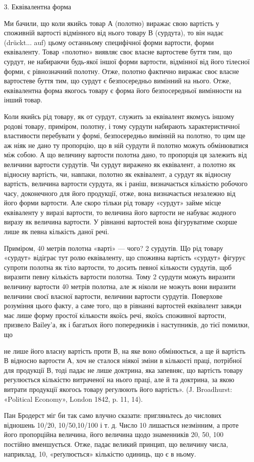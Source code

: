 3. Еквівалентна форма

Ми бачили, що коли якийсь товар А (полотно) виражає свою вартість у споживній вартості відмінного
від нього товару В (сурдута), то він надає (drückt... auf) цьому останньому специфічної форми
вартости, форми еквіваленту. Товар «полотно» виявляє своє власне вартостеве буття тим, що сурдут, не
набираючи будь-якої іншої форми вартости, відмінної від його тілесної форми, є рівнозначний полотну.
Отже, полотно фактично виражає своє власне вартостеве буття тим, що сурдут є безпосередньо вимінний
на нього. Отже, еквівалентна форма якогось товару є форма його безпосередньої вимінности на інший
товар.

Коли якийсь рід товару, як от сурдут, служить за еквівалент якомусь іншому родові товару, приміром,
полотну, і тому сурдути набирають характеристичної властивости перебувати у формі, безпосередньо
вимінній на полотно, то цим ще аж ніяк не дано ту пропорцію, що в ній сурдути й полотно можуть
обмінюватися між собою. А що величину вартости полотна дано, то пропорція ця залежить від величини
вартости сурдутів. Чи сурдут виражено як еквівалент, а полотно як відносну вартість, чи, навпаки,
полотно як еквівалент, а сурдут як відносну вартість, величина вартости сурдута, як і раніш,
визначається кількістю робочого часу, доконечного для його продукції, отже, вона  визначається
незалежно від його форми вартости. Але скоро тільки рід товару «сурдут» займе місце еквіваленту у
виразі вартости, то величина його вартости не набуває жодного виразу як величина вартости. У
рівнанні вартостей вона фігуруватиме скорше лише як певна кількість даної речі.

Приміром, 40 метрів полотна «варті» — чого? 2 сурдутів. Що рід товару «сурдут» відіграє тут ролю
еквіваленту, що споживна вартість «сурдут» фігурує супроти полотна як тіло вартости, то досить
певної кількости сурдутів, щоб виразити певну кількість вартости полотна. Тому 2 сурдути можуть
виразити величину вартости 40 метрів полотна, але ж ніколи не можуть вони виразити величини своєї
власної вартости, величини вартости сурдутів. Поверхове розуміння цього факту, а саме того, що в
рівнанні вартостей еквівалент завжди має лише форму простої кількости якоїсь речі, якоїсь споживної
вартости, призвело Ваіlеу’а, як і багатьох його попередників і наступників, до тієї помилки, що

не лише його власну вартість проти В, на яке воно обмінюється, а ще й вартість В відносно вартости
А, хоч не сталося ніякої зміни в кількості праці, потрібної для продукції В, тоді падає не лише
доктрина, яка запевняє, що вартість товару регулюється кількістю витраченої на нього праці, але й та
доктрина, за якою витрати продукції якогось товару регулюють його вартість». (J. Broadhurst:
«Political Economy», London 1842, p. 11, 14).

Пан Бродерст міг би так само влучно сказати: пригляньтесь до числових відношень 10/20, 10/50,10/100
і т. д. Число 10 лишається незмінним, а проте його пропорційна величина, його величина щодо
знаменників 20, 50, 100 постійно вменшується. Отже, падає великий принцип, що величину числа,
наприклад, 10, «реґулюється» кількістю одиниць, що є в ньому.
\parbreak{}  %
